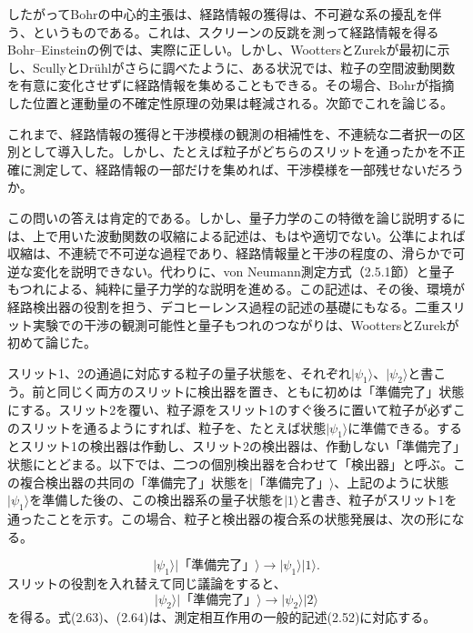 \hypertarget{srcpage:63}{}\label{srcpage:63}
したがってBohrの中心的主張は、経路情報の獲得は、不可避な系の擾乱を伴う、というものである。これは、スクリーンの反跳を測って経路情報を得るBohr--Einsteinの例では、実際に正しい。しかし、WoottersとZurek\cite{ref074}が最初に示し、ScullyとDrühl\cite{ref075}がさらに調べたように、ある状況では、粒子の空間波動関数を有意に変化させずに経路情報を集めることもできる。その場合、Bohrが指摘した位置と運動量の不確定性原理の効果は軽減される。次節でこれを論じる。

これまで、経路情報の獲得と干渉模様の観測の相補性を、不連続な二者択一の区別として導入した。しかし、たとえば粒子がどちらのスリットを通ったかを不正確に測定して、経路情報の一部だけを集めれば、干渉模様を一部残せないだろうか\cite{ref074}。

この問いの答えは肯定的である。しかし、量子力学のこの特徴を論じ説明するには、上で用いた波動関数の収縮による記述は、もはや適切でない。公準によれば収縮は、不連続で不可逆な過程であり、経路情報量と干渉の程度の、滑らかで可逆な変化を説明できない。代わりに、von Neumann測定方式（2.5.1節）と量子もつれによる、純粋に量子力学的な説明を進める。この記述は、その後、環境が経路検出器の役割を担う、デコヒーレンス過程の記述の基礎にもなる。二重スリット実験での干渉の観測可能性と量子もつれのつながりは、WoottersとZurek\cite{ref074}が初めて論じた。

スリット1、2の通過に対応する粒子の量子状態を、それぞれ$\lvert\psi_1\rangle$、$\lvert\psi_2\rangle$と書こう。前と同じく両方のスリットに検出器を置き、ともに初めは「準備完了」状態にする。スリット2を覆い、粒子源をスリット1のすぐ後ろに置いて粒子が必ずこのスリットを通るようにすれば、粒子を、たとえば状態$\lvert\psi_1\rangle$に準備できる。するとスリット1の検出器は作動し、スリット2の検出器は、作動しない「準備完了」状態にとどまる。以下では、二つの個別検出器を合わせて「検出器」と呼ぶ。この複合検出器の共同の「準備完了」状態を$\lvert\text{「準備完了」}\rangle$、上記のように状態$\lvert\psi_1\rangle$を準備した後の、この検出器系の量子状態を$\lvert1\rangle$と書き、粒子がスリット1を通ったことを示す。この場合、粒子と検出器の複合系の状態発展は、次の形になる。

\hypertarget{srcpage:64}{}\label{srcpage:64}
\begin{equation}\lvert\psi_1\rangle\lvert\text{「準備完了」}\rangle\longrightarrow\lvert\psi_1\rangle\lvert1\rangle.\tag{2.63}\end{equation}
スリットの役割を入れ替えて同じ議論をすると、
\begin{equation}\lvert\psi_2\rangle\lvert\text{「準備完了」}\rangle\longrightarrow\lvert\psi_2\rangle\lvert2\rangle\tag{2.64}\end{equation}
を得る。式(2.63)、(2.64)は、測定相互作用の一般的記述(2.52)に対応する。

